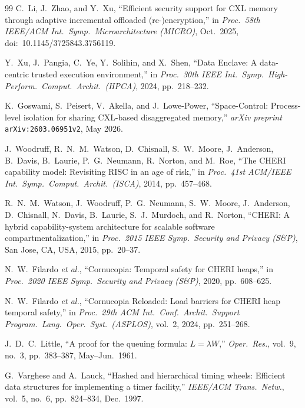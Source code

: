 \documentclass[10pt,twocolumn]{article}
\theoremstyle{spectralthm}
\begin{document}
\begin{thebibliography}{99}
C.~Li, J.~Zhao, and Y.~Xu, ``Efficient security support for CXL memory through adaptive incremental offloaded (re-)encryption,'' in \textit{Proc.\ 58th IEEE/ACM Int.\ Symp.\ Microarchitecture (MICRO)}, Oct.\ 2025, doi:~10.1145/3725843.3756119.

Y.~Xu, J.~Pangia, C.~Ye, Y.~Solihin, and X.~Shen, ``Data Enclave: A data-centric trusted execution environment,'' in \textit{Proc.\ 30th IEEE Int.\ Symp.\ High-Perform.\ Comput.\ Archit.\ (HPCA)}, 2024, pp.~218--232.

K.~Goswami, S.~Peisert, V.~Akella, and J.~Lowe-Power, ``Space-Control: Process-level isolation for sharing CXL-based disaggregated memory,'' \textit{arXiv preprint} \texttt{arXiv:2603.06951v2}, May 2026.

J.~Woodruff, R.~N.~M.~Watson, D.~Chisnall, S.~W.~Moore, J.~Anderson, B.~Davis, B.~Laurie, P.~G.~Neumann, R.~Norton, and M.~Roe, ``The CHERI capability model: Revisiting RISC in an age of risk,'' in \textit{Proc.\ 41st ACM/IEEE Int.\ Symp.\ Comput.\ Archit.\ (ISCA)}, 2014, pp.~457--468.

R.~N.~M.~Watson, J.~Woodruff, P.~G.~Neumann, S.~W.~Moore, J.~Anderson, D.~Chisnall, N.~Davis, B.~Laurie, S.~J.~Murdoch, and R.~Norton, ``CHERI: A hybrid capability-system architecture for scalable software compartmentalization,'' in \textit{Proc.\ 2015 IEEE Symp.\ Security and Privacy (S\&P)}, San Jose, CA, USA, 2015, pp.~20--37.

N.~W.~Filardo \textit{et al.}, ``Cornucopia: Temporal safety for CHERI heaps,'' in \textit{Proc.\ 2020 IEEE Symp.\ Security and Privacy (S\&P)}, 2020, pp.~608--625.

N.~W.~Filardo \textit{et al.}, ``Cornucopia Reloaded: Load barriers for CHERI heap temporal safety,'' in \textit{Proc.\ 29th ACM Int.\ Conf.\ Archit.\ Support Program.\ Lang.\ Oper.\ Syst.\ (ASPLOS)}, vol.~2, 2024, pp.~251--268.

J.~D.~C.~Little, ``A proof for the queuing formula: $L = \lambda W$,'' \textit{Oper.\ Res.}, vol.~9, no.~3, pp.~383--387, May--Jun.\ 1961.

G.~Varghese and A.~Lauck, ``Hashed and hierarchical timing wheels: Efficient data structures for implementing a timer facility,'' \textit{IEEE/ACM Trans.\ Netw.}, vol.~5, no.~6, pp.~824--834, Dec.\ 1997.


\end{thebibliography}
\end{document}
